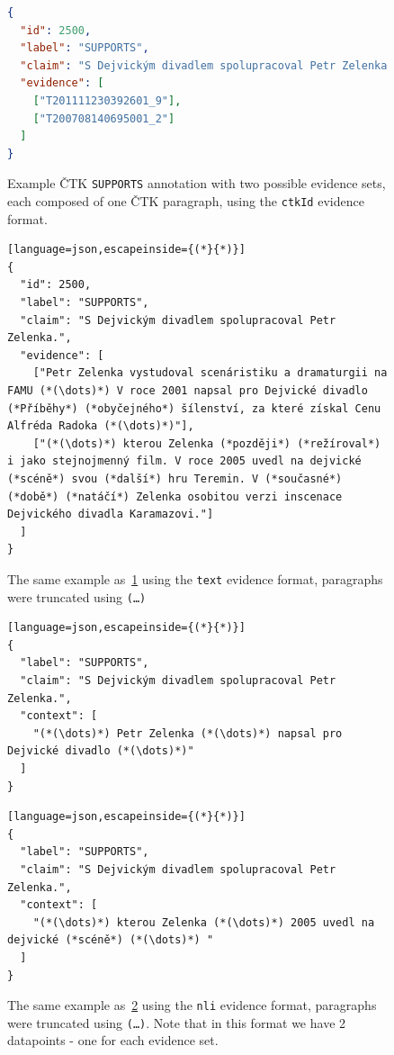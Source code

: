 \begin{figure}[H]
\begin{lstlisting}[language=json]
{
  "id": 2500,
  "label": "SUPPORTS",
  "claim": "S Dejvickým divadlem spolupracoval Petr Zelenka.",
  "evidence": [
    ["T201111230392601_9"],
    ["T200708140695001_2"]
  ]
}
\end{lstlisting}
    \caption[Example of \textsf{ČTK} datapoint, \texttt{ctkId} evidence format]{Example \textsf{ČTK} \texttt{SUPPORTS} annotation with two possible evidence sets, each composed of one \textsf{ČTK} paragraph, using the \texttt{ctkId} evidence format.}
    \label{list:fcheck-ctkid}
\end{figure}
\begin{figure}[H]
\begin{lstlisting}[language=json,escapeinside={(*}{*)}]
{
  "id": 2500,
  "label": "SUPPORTS",
  "claim": "S Dejvickým divadlem spolupracoval Petr Zelenka.",
  "evidence": [
    ["Petr Zelenka vystudoval scenáristiku a dramaturgii na FAMU (*(\dots)*) V roce 2001 napsal pro Dejvické divadlo (*Příběhy*) (*obyčejného*) šílenství, za které získal Cenu Alfréda Radoka (*(\dots)*)"],
    ["(*(\dots)*) kterou Zelenka (*později*) (*režíroval*) i jako stejnojmenný film. V roce 2005 uvedl na dejvické (*scéně*) svou (*další*) hru Teremin. V (*současné*) (*době*) (*natáčí*) Zelenka osobitou verzi inscenace Dejvického divadla Karamazovi."]
  ]
}
\end{lstlisting}

    \caption[Example of \textsf{ČTK} datapoint, \texttt{text} evidence format]{The same example as~\ref{list:fcheck-ctkid} using the \texttt{text} evidence format, paragraphs were truncated using \texttt{(\dots)}}
    \label{list:fcheck-text}
\end{figure}
\begin{figure}[H]
\begin{lstlisting}[language=json,escapeinside={(*}{*)}]
{
  "label": "SUPPORTS",
  "claim": "S Dejvickým divadlem spolupracoval Petr Zelenka.",
  "context": [
    "(*(\dots)*) Petr Zelenka (*(\dots)*) napsal pro Dejvické divadlo (*(\dots)*)"
  ]
}
\end{lstlisting}

\begin{lstlisting}[language=json,escapeinside={(*}{*)}]
{
  "label": "SUPPORTS",
  "claim": "S Dejvickým divadlem spolupracoval Petr Zelenka.",
  "context": [
    "(*(\dots)*) kterou Zelenka (*(\dots)*) 2005 uvedl na dejvické (*scéně*) (*(\dots)*) "
  ]
}
\end{lstlisting}

    \caption[Example of \textsf{ČTK} datapoint, \texttt{nli} evidence format]{The same example as~\ref{list:fcheck-text} using the \texttt{nli} evidence format, paragraphs were truncated using \texttt{(\dots)}. Note that in this format we have 2 datapoints - one for each evidence set.}
    \label{list:fcheck-nli}
\end{figure}

